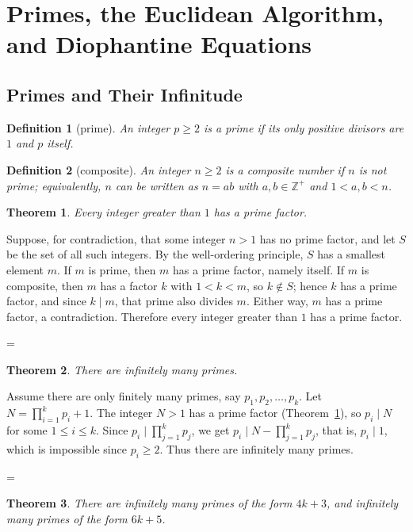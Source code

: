 \documentclass[11pt]{article}
\makeatletter
\theoremstyle{ntstyle}
\newtheorem{theorem}{Theorem}[subsection]
\newtheorem{definition}{Definition}[subsection]
\let\nt@closedisplay\]
\def\nt@guardedclose{\@ifnextchar\par{\nt@closeafterpar}{\@ifnextchar\end{\postdisplaypenalty\@M\nt@closedisplay}{\nt@closedisplay}}}
\def\nt@closeafterpar\par{\@ifnextchar\par{\nt@closeafterpar}{\@ifnextchar\end{\postdisplaypenalty\@M\nt@closedisplay\par}{\nt@closedisplay\par}}}
\renewenvironment{proof}[1][\proofname]{\par
  \pushQED{\qed}\normalfont\topsep\medskipamount\edef\nt@afterproof{\@endparpenalty=\the\@endparpenalty\relax}\@beginparpenalty\@M\@endparpenalty\@M\let\]\nt@guardedclose\trivlist\item[]\textit{#1\@addpunct{.}} \ignorespaces}{\ifvmode\addpenalty\@M\fi\popQED\nt@afterproof\endtrivlist\@endpefalse}
\makeatother
\begin{document}
\section{Primes, the Euclidean Algorithm, and Diophantine Equations}

\subsection{Primes and Their Infinitude}

\begin{definition}[prime]\label{def:2.1.1} An integer $p \ge 2$
	is a prime if its only positive divisors are $1$ and $p$ itself.

\end{definition}
\begin{definition}[composite]\label{def:2.1.2} An integer $n \ge 2$ is a
	composite number if $n$ is not prime; equivalently, $n$ can be written as $n = ab$ with $a, b \in \mathbb{Z}^+$ and $1 < a, b < n$.

\end{definition}
\begin{theorem}\label{thm:2.1.1} Every integer greater than $1$ has
	a prime factor.

\end{theorem}

\begin{proof} Suppose, for contradiction, that some
	integer $n > 1$ has no prime factor, and let $S$ be the set of all
	such integers. By the well-ordering principle, $S$ has a smallest
	element $m$. If $m$ is prime, then $m$ has a prime factor, namely
	itself. If $m$ is composite, then $m$ has a factor
	$k$ with $1 < k < m$, so $k \notin S$; hence $k$ has a prime factor,
	and since $k \mid m$, that prime also divides $m$. Either way, $m$ has
	a prime factor, a contradiction. Therefore every integer greater than
	$1$ has a prime factor.

\end{proof}
\begin{theorem}\label{thm:2.1.2} There are infinitely many primes.

\end{theorem}

\begin{proof} Assume there are only finitely many primes, say $p_1,
		p_2, \ldots, p_k$. Let $N = \prod_{i=1}^{k} p_i + 1$. The integer $N > 1$
	has a prime factor (Theorem~\ref{thm:2.1.1}), so $p_i \mid N$ for some $1 \le
		i \le k$. Since $p_i \mid \prod_{j=1}^{k} p_j$, we get $p_i \mid N -
		\prod_{j=1}^{k} p_j$, that is, $p_i \mid 1$, which is impossible since
	$p_i\ge2$. Thus there are infinitely many primes.

\end{proof}
\begin{theorem}\label{thm:2.1.3}
	There are infinitely many primes of the form $4k+3$, and infinitely many
	primes of the form $6k+5$.

\end{theorem}
\end{document}
